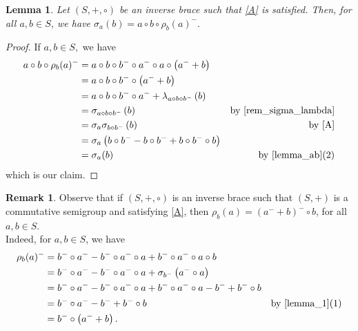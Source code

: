 \documentclass[preprint,1p]{elsarticle}
\newtheorem{lemma}[theor]{Lemma}
\theoremstyle{definition}               %
\newtheorem{rem}[theor]{Remark}
\begin{document}
\begin{lemma}\label{sigma_rho}
Let $(S,+,\circ)$ be an inverse brace such that \eqref{A} is satisfied. Then, for all $a, b \in S$, we have $\sigma_a(b)=a \circ b \circ \rho_b(a)^-.$
\end{lemma}
\begin{proof} 
  If $a,b \in S,$ we have
    \begin{align*}
        a\circ b \circ \rho_b(a)^-&=a\circ b \circ b^- \circ a^- \circ a \circ \left(a^- +b\right)\\
        &=a\circ b \circ b^- \circ  \left(a^- +b\right) \\
        &=a\circ b \circ b^- \circ a^- +\lambda_{a\circ b \circ b^-}\left(b\right) \\
        &=\sigma_{a\circ b \circ b^-}\left(b\right) &\mbox{by \cref{rem_sigma_lambda}}\\
        &=\sigma_{a}\sigma_{b \circ b^-}\left(b\right)  &\mbox{by \eqref{A}}\\
        &=\sigma_a\left(b \circ b^--b \circ b^-+b \circ b^- \circ b\right)\\
        &=\sigma_a(b) &\mbox{by \cref{lemma_ab}(2)}
    \end{align*}
 which is our claim.
\end{proof}

\smallskip

\begin{rem}
    Observe that if $(S, +, \circ)$ is an inverse brace such that $(S, +)$ is a commutative semigroup and satisfying \eqref{A}, then
        $\rho_b(a)=\left(a^-+b \right)^- \circ b$, for all $a, b \in S$.\\
    Indeed, for $a, b \in S$, we have
    \begin{align*}
        \rho_b(a)^-
        &=b^- \circ a^- -b^- \circ a^- \circ a + b^- \circ a^-  \circ a \circ b\\
        &=b^- \circ a^- -b^- \circ a^- \circ a +\sigma_{b^-}\left(a^- \circ a\right)\\
        &=b^- \circ a^-  - b^- \circ a^- \circ a+b^- \circ a^- \circ a -b^-+b^- \circ b\\
        &=b^- \circ a^- -b^-+b^- \circ b &\mbox{by \cref{lemma_1}(1)}\\
        &=b^- \circ \left(a^-+b\right).
    \end{align*}
\end{rem}
\end{document}

